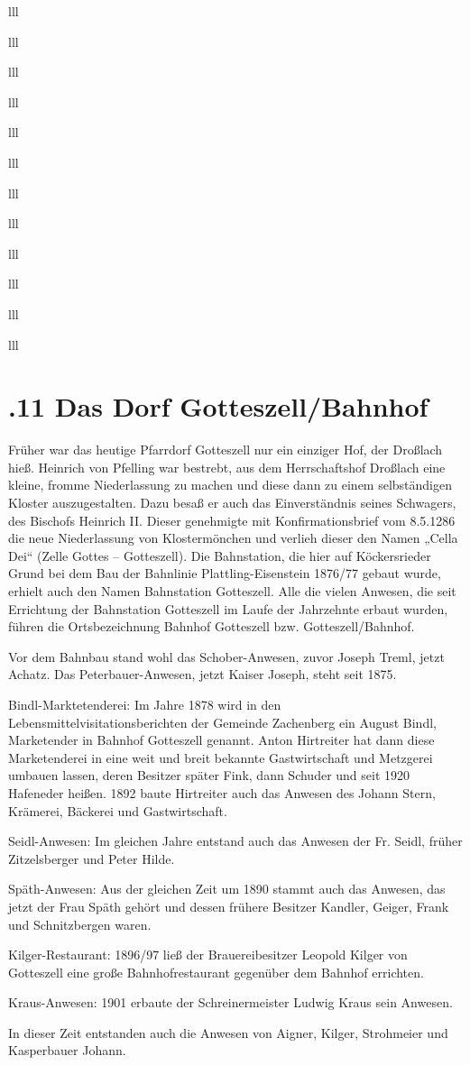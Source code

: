\documentclass[12pt,a4pager]{book}
\begin{document}
\begin{tabuluar}{lll}
\begin{tabuluar}{lll}
\begin{tabuluar}{lll}
\begin{tabuluar}{lll}
\begin{tabuluar}{lll}
\begin{tabuluar}{lll}
\begin{tabuluar}{lll}
\begin{tabuluar}{lll}
\begin{tabuluar}{lll}
\begin{tabuluar}{lll}
\begin{tabuluar}{lll}
\begin{tabuluar}{lll}
\section{.11 Das Dorf Gotteszell/Bahnhof}

Früher war das heutige Pfarrdorf Gotteszell nur ein einziger Hof, der Droßlach
hieß. Heinrich von Pfelling war bestrebt, aus dem Herrschaftshof Droßlach eine
kleine, fromme Niederlassung zu machen und diese dann zu einem selbständigen
Kloster auszugestalten. Dazu besaß er auch das Einverständnis seines Schwagers,
des Bischofs Heinrich II. Dieser genehmigte mit Konfirmationsbrief vom 8.5.1286
die neue Niederlassung von Klostermönchen und verlieh dieser den Namen „Cella
Dei“ (Zelle Gottes – Gotteszell). Die Bahnstation, die hier auf Köckersrieder
Grund bei dem Bau der Bahnlinie Plattling-Eisenstein 1876/77 gebaut wurde,
erhielt auch den Namen Bahnstation Gotteszell. Alle die vielen Anwesen, die seit
Errichtung der Bahnstation Gotteszell im Laufe der Jahrzehnte erbaut wurden,
führen die Ortsbezeichnung Bahnhof Gotteszell bzw. Gotteszell/Bahnhof.

Vor dem Bahnbau stand wohl das Schober-Anwesen, zuvor Joseph Treml, jetzt
Achatz. Das Peterbauer-Anwesen, jetzt Kaiser Joseph, steht seit 1875.

Bindl-Marktetenderei: Im Jahre 1878 wird in den Lebensmittelvisitationsberichten
der Gemeinde Zachenberg ein August Bindl, Marketender in Bahnhof Gotteszell
genannt. Anton Hirtreiter hat dann diese Marketenderei in eine weit und breit
bekannte Gastwirtschaft und Metzgerei umbauen lassen, deren Besitzer später
Fink, dann Schuder und seit 1920 Hafeneder heißen. 1892 baute Hirtreiter auch
das Anwesen des Johann Stern, Krämerei, Bäckerei und Gastwirtschaft.

Seidl-Anwesen: Im gleichen Jahre entstand auch das Anwesen der Fr. Seidl, früher
Zitzelsberger und Peter Hilde.

Späth-Anwesen: Aus der gleichen Zeit um 1890 stammt auch das Anwesen, das jetzt
der Frau Späth gehört und dessen frühere Besitzer Kandler, Geiger, Frank und
Schnitzbergen waren.

Kilger-Restaurant: 1896/97 ließ der Brauereibesitzer Leopold Kilger von
Gotteszell eine große Bahnhofrestaurant gegenüber dem Bahnhof errichten.

Kraus-Anwesen: 1901 erbaute der Schreinermeister Ludwig Kraus sein Anwesen.

In dieser Zeit entstanden auch die Anwesen von Aigner, Kilger, Strohmeier und
Kasperbauer Johann.


\end{tabuluar}
\end{tabuluar}
\end{tabuluar}
\end{tabuluar}
\end{tabuluar}
\end{tabuluar}
\end{tabuluar}
\end{tabuluar}
\end{tabuluar}
\end{tabuluar}
\end{tabuluar}
\end{tabuluar}
\end{document}
